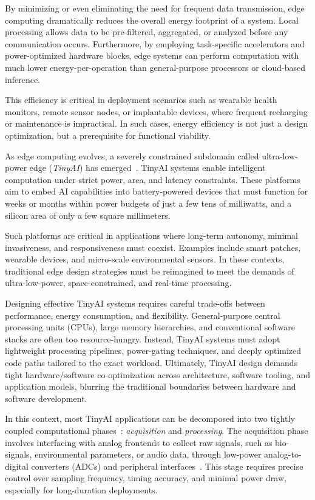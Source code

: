         By minimizing or even eliminating the need for frequent data transmission, edge computing dramatically reduces the overall energy footprint of a system. Local processing allows data to be pre-filtered, aggregated, or analyzed before any communication occurs. Furthermore, by employing task-specific accelerators and power-optimized hardware blocks, edge systems can perform computation with much lower \mbox{energy-per-operation} than general-purpose processors or cloud-based inference.
        
        This efficiency is critical in deployment scenarios such as wearable health monitors, remote sensor nodes, or implantable devices, where frequent recharging or maintenance is impractical. In such cases, energy efficiency is not just a design optimization, but a prerequisite for functional viability.

        As edge computing evolves, a severely constrained subdomain called ultra-low-power edge (\emph{TinyAI}) has emerged~\cite{co-design_vision}. TinyAI systems enable intelligent computation under strict power, area, and latency constraints. These platforms aim to embed AI capabilities into battery-powered devices that must function for weeks or months within power budgets of just a few tens of milliwatts, and a silicon area of only a few square millimeters.
        
        Such platforms are critical in applications where long-term autonomy, minimal invasiveness, and responsiveness must coexist. Examples include smart patches, wearable devices, and micro-scale environmental sensors. In these contexts, traditional edge design strategies must be reimagined to meet the demands of ultra-low-power, space-constrained, and real-time processing.
        
        Designing effective TinyAI systems requires careful trade-offs between performance, energy consumption, and flexibility. General-purpose central processing units (CPUs), large memory hierarchies, and conventional software stacks are often too resource-hungry. Instead, TinyAI systems must adopt lightweight processing pipelines, power-gating techniques, and deeply optimized code paths tailored to the exact workload. Ultimately, TinyAI design demands tight hardware/software co-optimization across architecture, software tooling, and application models, blurring the traditional boundaries between hardware and software development.

        In this context, most TinyAI applications can be decomposed into two tightly coupled computational phases~\cite{bio_apps}: \emph{acquisition} and \emph{processing}. The acquisition phase involves interfacing with analog frontends to collect raw signals, such as bio-signals, environmental parameters, or audio data, through low-power analog-to-digital converters (ADCs) and peripheral interfaces~\cite{taji2024energy}. This stage requires precise control over sampling frequency, timing accuracy, and minimal power draw, especially for long-duration deployments. 

